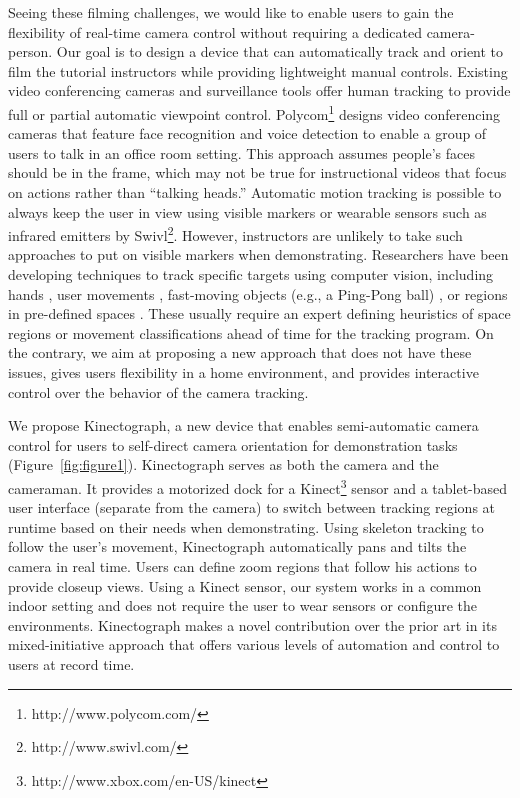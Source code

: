 Seeing these filming challenges, we would like to enable users to gain the flexibility of real-time camera control without requiring a dedicated camera-person. Our goal is to design a device that can automatically track and orient to film the tutorial instructors while providing lightweight manual controls. Existing video conferencing cameras and surveillance tools offer human tracking to provide full or partial automatic viewpoint control. Polycom\footnote{http://www.polycom.com/} designs video conferencing cameras that feature face recognition and voice detection to enable a group of users to talk in an office room setting. This approach assumes people's faces should be in the frame, which may not be true for instructional videos that focus on actions rather than ``talking heads.''
%
Automatic motion tracking is possible to always keep the user in view using visible markers \cite{Ranjan:2010} or wearable sensors such as infrared emitters by Swivl\footnote{http://www.swivl.com/}. However, instructors are unlikely to take such approaches to put on visible markers when demonstrating.
%
Researchers have been developing techniques to track specific targets using computer vision, including hands \cite{Ranjan:2008}, user movements \cite{Wilson:2012fb}, fast-moving objects (e.g., a Ping-Pong ball) \cite{Okumura:2011tr}, or regions in pre-defined spaces \cite{Ranjan:2007}. These usually require an expert defining heuristics of space regions or movement classifications ahead of time for the tracking program. On the contrary, we aim at proposing a new approach that does not have these issues, gives users flexibility in a home environment, and provides interactive control over the behavior of the camera tracking.
%
%

\clearpage
We propose Kinectograph, a new device that enables semi-automatic camera control for users to self-direct camera orientation for demonstration tasks (Figure~\ref{fig:figure1}). Kinectograph serves as both the camera and the cameraman. It provides a motorized dock for a Kinect\footnote{http://www.xbox.com/en-US/kinect} sensor and a tablet-based user interface (separate from the camera) to switch between tracking regions at runtime based on their needs when demonstrating. Using skeleton tracking to follow the user’s movement, Kinectograph automatically pans and tilts the camera in real time. Users can define zoom regions that follow his actions to provide closeup views. Using a Kinect sensor, our system works in a common indoor setting and does not require the user to wear sensors or configure the environments. Kinectograph makes a novel contribution over the prior art in its mixed-initiative approach that offers various levels of automation and control to users at record time.

